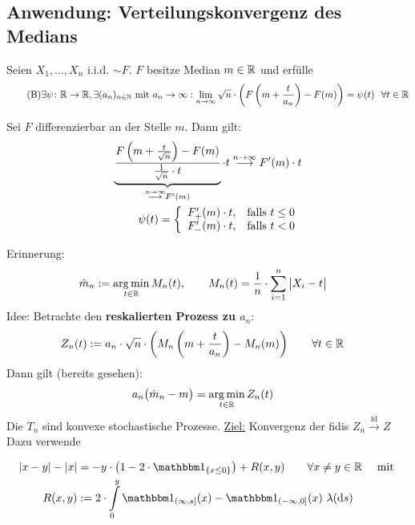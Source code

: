 \subsection{Anwendung: Verteilungskonvergenz des Medians} %
Seien $X_1,\ldots,X_n$ i.i.d. $\sim F$.
$F$ besitze Median $m\in\mathbb{R}$ und erfülle
\begin{align}\label{eqAnwendungVerteilungskonv_B}\tag{B}
	\exists\psi\colon\mathbb{R}\to\mathbb{R},\exists(a_n)_{n\in\mathbb{N}}\text{ mit } a_n\to\infty:
	\lim\limits_{n\to\infty}\sqrt{n}\cdot\left(F\left(m+\frac{t}{a_n}\right)-F(m)\right)=\psi(t)
	~~\forall t\in\mathbb{R}
\end{align}

\begin{beisp} %
	Sei $F$ differenzierbar an der Stelle $m$.
	Dann gilt:
	\begin{align*}
		\underbrace{\frac{F\left(m+\frac{t}{\sqrt{n}}\right)-F(m)}{\frac{1}{\sqrt{n}}\cdot t}}_{
			\overset{n\to\infty}{\longrightarrow}F'(m)
		}\cdot t
		\overset{n\to\infty}{\longrightarrow}F'(m)\cdot t\\
		\psi(t)=\left\lbrace\begin{array}{cl}
			F_+'(m)\cdot t, &\text{falls } t\leq 0\\
			F_-'(m)\cdot t,&\text{falls } t<0
		\end{array}\right.
	\end{align*}
\end{beisp}

Erinnerung:
\begin{align*}
	\hat{m}_n&:=\operatorname*{arg\,min}\limits_{t\in\mathbb{R}} M_n(t),\qquad
	M_n(t)=\frac{1}{n}\cdot\sum\limits_{i=1}^n\big|X_i-t\big|
\end{align*}
Idee: Betrachte den \textbf{reskalierten Prozess zu $a_n$}:
\begin{align*}
	Z_n(t)&:=a_n\cdot\sqrt{n}\cdot\left(M_n\left(m+\frac{t}{a_n}\right)-M_n(m)\right)\qquad\forall t\in\mathbb{R}
\end{align*}
Dann gilt (bereits gesehen):
\begin{align*}
	a_n\big(\hat{m}_n-m\big)
	&=\operatorname*{arg\,min}\limits_{t\in\mathbb{R}} Z_n(t)
\end{align*}
Die $T_n$ sind konvexe stochastische Prozesse.
\underline{Ziel:} Konvergenz der fidis $Z_n\overset{\text{fd}}{\longrightarrow}Z$\\
Dazu verwende

\begin{lemma}\label{lemma10.5KeithKnight}
	\begin{align*}
		|x-y|-|x|&=-y\cdot\left(1-2\cdot\indi_{\lbrace x\leq 0\rbrace}\right)+R(x,y)
		\qquad\forall x\neq y\in\R\quad\mit\\
		R(x,y)&:=2\cdot\int\limits_0^y\indi_{(\infty,s]}(x)-\indi_{(-\infty,0]}(x)~\lambda(\d s)
	\end{align*}
\end{lemma}

